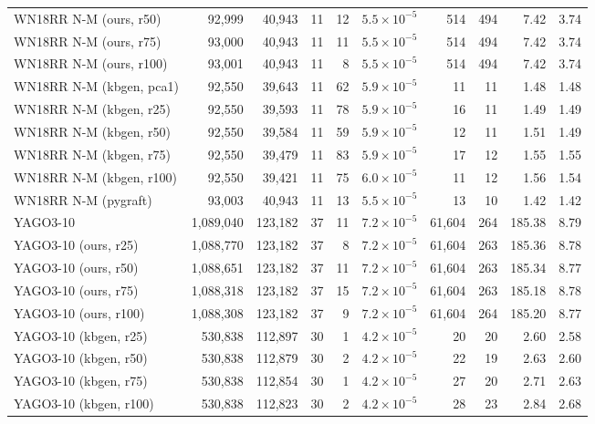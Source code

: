 \begin{tabular}{lrrrrrrrrr}
WN18RR N-M (ours, r50) & 92{,}999 & 40{,}943 & 11 & 12 & $5.5\times10^{-5}$ & 514 & 494 & 7.42 & 3.74 \\
WN18RR N-M (ours, r75) & 93{,}000 & 40{,}943 & 11 & 11 & $5.5\times10^{-5}$ & 514 & 494 & 7.42 & 3.74 \\
WN18RR N-M (ours, r100) & 93{,}001 & 40{,}943 & 11 & 8 & $5.5\times10^{-5}$ & 514 & 494 & 7.42 & 3.74 \\
WN18RR N-M (kbgen, pca1) & 92{,}550 & 39{,}643 & 11 & 62 & $5.9\times10^{-5}$ & 11 & 11 & 1.48 & 1.48 \\
WN18RR N-M (kbgen, r25) & 92{,}550 & 39{,}593 & 11 & 78 & $5.9\times10^{-5}$ & 16 & 11 & 1.49 & 1.49 \\
WN18RR N-M (kbgen, r50) & 92{,}550 & 39{,}584 & 11 & 59 & $5.9\times10^{-5}$ & 12 & 11 & 1.51 & 1.49 \\
WN18RR N-M (kbgen, r75) & 92{,}550 & 39{,}479 & 11 & 83 & $5.9\times10^{-5}$ & 17 & 12 & 1.55 & 1.55 \\
WN18RR N-M (kbgen, r100) & 92{,}550 & 39{,}421 & 11 & 75 & $6.0\times10^{-5}$ & 11 & 12 & 1.56 & 1.54 \\
WN18RR N-M (pygraft) & 93{,}003 & 40{,}943 & 11 & 13 & $5.5\times10^{-5}$ & 13 & 10 & 1.42 & 1.42 \\
\midrule
YAGO3-10 & 1{,}089{,}040 & 123{,}182 & 37 & 11 & $7.2\times10^{-5}$ & 61{,}604 & 264 & 185.38 & 8.79 \\
YAGO3-10 (ours, r25) & 1{,}088{,}770 & 123{,}182 & 37 & 8 & $7.2\times10^{-5}$ & 61{,}604 & 263 & 185.36 & 8.78 \\
YAGO3-10 (ours, r50) & 1{,}088{,}651 & 123{,}182 & 37 & 11 & $7.2\times10^{-5}$ & 61{,}604 & 263 & 185.34 & 8.77 \\
YAGO3-10 (ours, r75) & 1{,}088{,}318 & 123{,}182 & 37 & 15 & $7.2\times10^{-5}$ & 61{,}604 & 263 & 185.18 & 8.78 \\
YAGO3-10 (ours, r100) & 1{,}088{,}308 & 123{,}182 & 37 & 9 & $7.2\times10^{-5}$ & 61{,}604 & 264 & 185.20 & 8.77 \\
YAGO3-10 (kbgen, r25) & 530{,}838 & 112{,}897 & 30 & 1 & $4.2\times10^{-5}$ & 20 & 20 & 2.60 & 2.58 \\
YAGO3-10 (kbgen, r50) & 530{,}838 & 112{,}879 & 30 & 2 & $4.2\times10^{-5}$ & 22 & 19 & 2.63 & 2.60 \\
YAGO3-10 (kbgen, r75) & 530{,}838 & 112{,}854 & 30 & 1 & $4.2\times10^{-5}$ & 27 & 20 & 2.71 & 2.63 \\
YAGO3-10 (kbgen, r100) & 530{,}838 & 112{,}823 & 30 & 2 & $4.2\times10^{-5}$ & 28 & 23 & 2.84 & 2.68 \\

\end{tabular}
